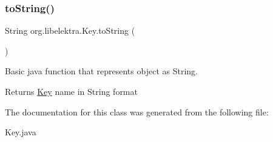 \subsubsection{\texorpdfstring{to\+String()}{toString()}}
{\footnotesize\ttfamily String org.\+libelektra.\+Key.\+to\+String (\begin{DoxyParamCaption}{ }\end{DoxyParamCaption})\hspace{0.3cm}{\ttfamily [inline]}}



Basic java function that represents object as String. 

\begin{DoxyReturn}{Returns}
\hyperlink{classorg_1_1libelektra_1_1Key}{Key} name in String format 
\end{DoxyReturn}


The documentation for this class was generated from the following file\+:\begin{DoxyCompactItemize}
\item 
Key.\+java\end{DoxyCompactItemize}
